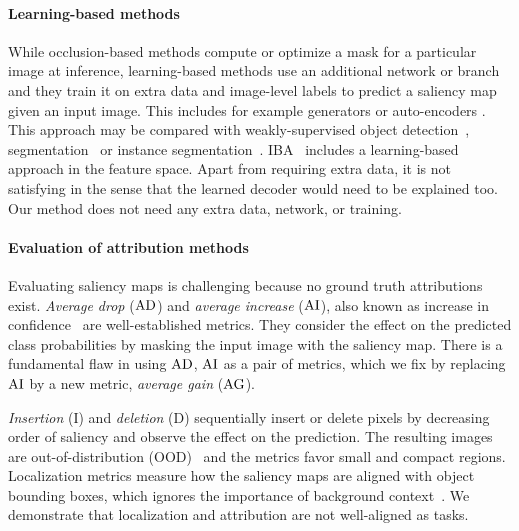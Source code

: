 
\paragraph{Learning-based methods}

While occlusion-based methods compute or optimize a mask for a particular image at inference, learning-based methods use an additional network or branch and they train it on extra data and image-level labels to predict a saliency map given an input image. This includes for example generators \citep{chang2018explaining} or auto-encoders \citep{dabkowski2017real, phang2020investigating, zolna2020classifier}. This approach may be compared with weakly-supervised object detection~\citep{bilen2016weakly}, segmentation~\citep{KoLa16} or instance segmentation~\citep{AhCK19}. IBA~\citep{schulz2020restricting} includes a learning-based approach in the feature space. Apart from requiring extra data, it is not satisfying in the sense that the learned decoder would need to be explained too. Our method does not need any extra data, network, or training.


\paragraph{Evaluation of attribution methods}

Evaluating saliency maps is challenging because no ground truth attributions exist. \emph{Average drop} ($\operatorname{AD}$) and \emph{average increase} ($\operatorname{AI}$), also known as increase in confidence~\cite{chattopadhay2018grad} are well-established metrics. They consider the effect on the predicted class probabilities by masking the input image with the saliency map. There is a fundamental flaw in using $\operatorname{AD}$, $\operatorname{AI}$ as a pair of metrics, which we fix by replacing $\operatorname{AI}$ by a new metric, \emph{average gain} ($\operatorname{AG}$).

\emph{Insertion} (I) and \emph{deletion} (D) sequentially insert or delete pixels by decreasing order of saliency and observe the effect on the prediction. The resulting images are out-of-distribution (OOD)~\cite{gomez2022metrics} and the metrics favor small and compact regions. Localization metrics measure how the saliency maps are aligned with object bounding boxes, which ignores the importance of background context~\cite{shetty2019not, rao2022towards}. We demonstrate that localization and attribution are not well-aligned as tasks.
